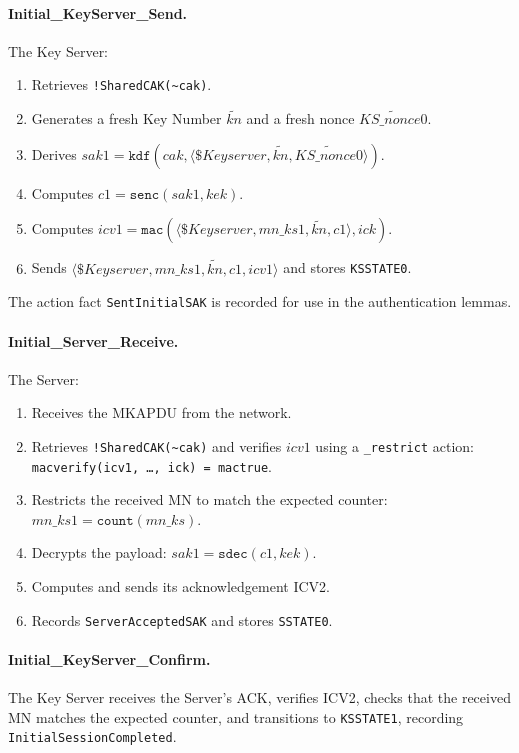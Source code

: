 \paragraph{Initial\_KeyServer\_Send.} The Key Server:
\begin{enumerate}
  \item Retrieves \texttt{!SharedCAK(\textasciitilde cak)}.
  \item Generates a fresh Key Number $\tilde{\mathit{kn}}$ and a fresh nonce $\widetilde{\mathit{KS\_nonce0}}$.
  \item Derives $\mathit{sak1} = \mathtt{kdf}(\mathit{cak}, \langle \$\mathit{Keyserver}, \tilde{\mathit{kn}}, \widetilde{\mathit{KS\_nonce0}}\rangle)$.
  \item Computes $\mathit{c1} = \mathtt{senc}(\mathit{sak1}, \mathit{kek})$.
  \item Computes $\mathit{icv1} = \mathtt{mac}(\langle \$\mathit{Keyserver}, \mathit{mn\_ks1}, \tilde{\mathit{kn}}, \mathit{c1}\rangle, \mathit{ick})$.
  \item Sends $\langle \$\mathit{Keyserver}, \mathit{mn\_ks1}, \tilde{\mathit{kn}}, \mathit{c1}, \mathit{icv1}\rangle$ and stores \texttt{KSSTATE0}.
\end{enumerate}
The action fact \texttt{SentInitialSAK} is recorded for use in the authentication lemmas.

\paragraph{Initial\_Server\_Receive.} The Server:
\begin{enumerate}
  \item Receives the MKAPDU from the network.
  \item Retrieves \texttt{!SharedCAK(\textasciitilde cak)} and verifies $\mathit{icv1}$ using a \texttt{\_restrict} action: \texttt{macverify(icv1, \ldots, ick) = mactrue}.
  \item Restricts the received MN to match the expected counter: $\mathit{mn\_ks1} = \mathtt{count}(\mathit{mn\_ks})$.
  \item Decrypts the payload: $\mathit{sak1} = \mathtt{sdec}(\mathit{c1}, \mathit{kek})$.
  \item Computes and sends its acknowledgement ICV2.
  \item Records \texttt{ServerAcceptedSAK} and stores \texttt{SSTATE0}.
\end{enumerate}

\paragraph{Initial\_KeyServer\_Confirm.} The Key Server receives the Server's ACK, verifies ICV2, checks that the received MN matches the expected counter, and transitions to \texttt{KSSTATE1}, recording \texttt{InitialSessionCompleted}.

